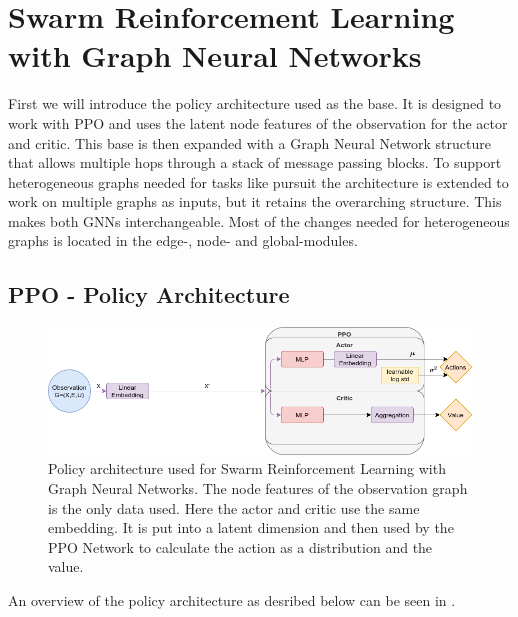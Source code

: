 
\chapter{Swarm Reinforcement Learning with Graph Neural Networks}
\label{ch:Architecture}
First we will introduce the policy architecture used as the base. It is designed to work with PPO and uses the latent node features of the observation for the actor and critic. This base is then expanded with a Graph Neural Network structure that allows multiple hops through a stack of message passing blocks. To support heterogeneous graphs needed for tasks like pursuit the architecture is extended to work on multiple graphs as inputs, but it retains the overarching structure. This makes both GNNs interchangeable. Most of the changes needed for heterogeneous graphs is located in the edge-, node- and global-modules.



\section{PPO - Policy Architecture}
\begin{figure}[htp]
    \centering
    \includegraphics[width=1.0\textwidth]{figures/PPO_no_message_passing.png}
    \hspace{1cm}   
    \caption{Policy architecture used for Swarm Reinforcement Learning with Graph Neural Networks. The node features of the observation graph is the only data used. Here the actor and critic use the same embedding. It is put into a latent dimension and then used by the PPO Network to calculate the action as a distribution and the value.}
    \label{fig:PPO_no_message_passing}
\end{figure}

An overview of the policy architecture as desribed below can be seen in .

